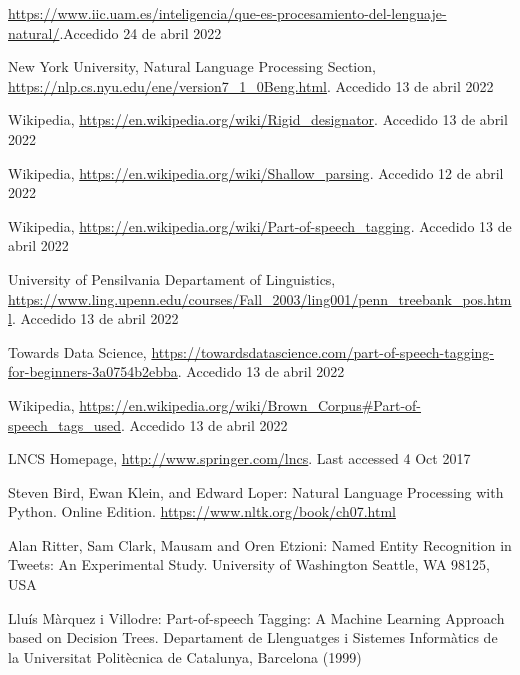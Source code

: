 \documentclass[runningheads]{llncs}
\begin{document}
\begin{thebibliography}{8}
%
%
%

\url{https://www.iic.uam.es/inteligencia/que-es-procesamiento-del-lenguaje-natural/}.Accedido 24 de abril 2022

New York University, Natural Language Processing Section, \url{https://nlp.cs.nyu.edu/ene/version7\_1\_0Beng.html}. Accedido 13
de abril 2022

Wikipedia, \url{https://en.wikipedia.org/wiki/Rigid\_designator}. Accedido 13
de abril 2022

Wikipedia, \url{https://en.wikipedia.org/wiki/Shallow\_parsing}. Accedido 12 de abril
2022

Wikipedia, \url{https://en.wikipedia.org/wiki/Part-of-speech\_tagging}. Accedido 13 de abril
2022

University of Pensilvania Departament of Linguistics, \url{https://www.ling.upenn.edu/courses/Fall\_2003/ling001/penn\_treebank\_pos.html}. Accedido 13 de abril 2022

Towards Data Science, \url{https://towardsdatascience.com/part-of-speech-tagging-for-beginners-3a0754b2ebba}. Accedido 13 de abril
2022

Wikipedia, \url{https://en.wikipedia.org/wiki/Brown\_Corpus\#Part-of-speech\_tags\_used}. Accedido 13 de abril 2022

LNCS Homepage, \url{http://www.springer.com/lncs}. Last accessed 4
Oct 2017

Steven Bird, Ewan Klein, and Edward Loper: Natural Language Processing with Python. Online Edition. \url{https://www.nltk.org/book/ch07.html}

Alan Ritter, Sam Clark, Mausam and Oren Etzioni: Named Entity Recognition in Tweets:
An Experimental Study. University of Washington Seattle, WA 98125, USA

Lluís Màrquez i Villodre: Part-of-speech Tagging: A Machine Learning Approach based on Decision Trees. Departament de Llenguatges i Sistemes Informàtics de la Universitat Politècnica de Catalunya, Barcelona (1999)


\end{thebibliography}
\end{document}
